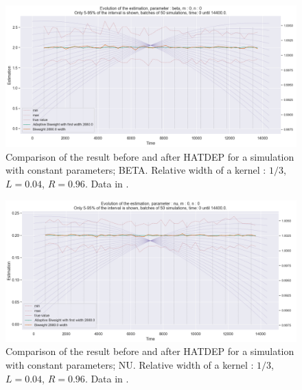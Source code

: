 \begin{figure}
\centering
\includegraphics[width = 0.90 \textwidth]{../imag/chap3/0/B.png}
\caption{Comparison of the result before and after HATDEP for a simulation with constant parameters; BETA. Relative width of a kernel : $1/3$, $L = 0.04$, $R = 0.96$. Data in \protect {}.}
\label{fig:first_estimate_0_beta}
\end{figure}

\begin{figure}
\centering
\includegraphics[width = 0.90 \textwidth]{../imag/chap3/0/C.png}
\caption{Comparison of the result before and after HATDEP for a simulation with constant parameters; NU. Relative width of a kernel : $1/3$, $L = 0.04$, $R = 0.96$. Data in \protect {}.}
\label{fig:first_estimate_0_nu}
\end{figure}










